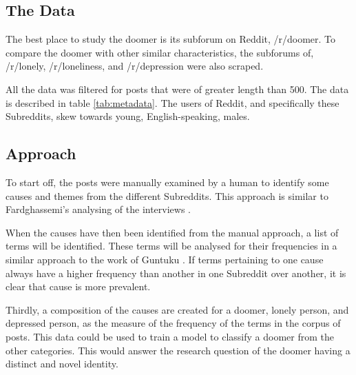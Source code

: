 \documentclass[../report.tex]{subfiles}
\begin{document}
\subsection{The Data}
The best place to study the doomer is its subforum on Reddit, /r/doomer. To compare the doomer with other similar characteristics, the subforums of, /r/lonely, /r/loneliness, and /r/depression were also scraped.

All the data was filtered for posts that were of greater length than 500. The data is described in table \ref{tab:metadata}.
The users of Reddit, and specifically these Subreddits, skew towards young, English-speaking, males. 


\subsection{Approach}
To start off, the posts were manually examined by a human to identify some causes and themes from the different Subreddits. 
This approach is similar to Fardghassemi's analysing of the interviews \cite{fardghassemi_interviews}.

When the causes have then been identified from the manual approach, a list of terms will be identified.
These terms will be analysed for their frequencies in a similar approach to the work of Guntuku \cite{twitter_loneliness}.
If terms pertaining to one cause always have a higher frequency than another in one Subreddit over another, it is clear that cause is more prevalent. 

Thirdly, a composition of the causes are created for a doomer, lonely person, and depressed person, as the measure of the frequency of the terms in the corpus of posts. This data could be used to train a model to classify a doomer from the other categories. This would answer the research question of the doomer having a distinct and novel identity.
\end{document}
